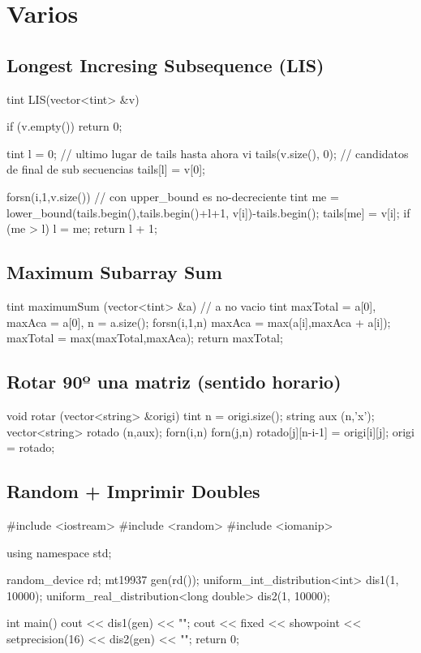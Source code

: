 \section{Varios}

\subsection{Longest Incresing Subsequence (LIS)}
\begin{code}
tint LIS(vector<tint> &v) {
  if (v.empty()) return 0;
  
  tint l = 0;             // ultimo lugar de tails hasta ahora
  vi tails(v.size(), 0);  // candidatos de final de sub secuencias
  tails[l] = v[0];
  
  forsn(i,1,v.size()) {
    // con upper_bound es no-decreciente
    tint me = lower_bound(tails.begin(),tails.begin()+l+1, v[i])-tails.begin();
    tails[me] = v[i];
    if (me > l) l = me;
  }
  return l + 1;
}
\end{code}

\subsection{Maximum Subarray Sum}
\begin{code}
tint maximumSum (vector<tint> &a) // a no vacio
{
	tint maxTotal = a[0], maxAca = a[0], n = a.size();
	forsn(i,1,n)
	{
		maxAca = max(a[i],maxAca + a[i]);
		maxTotal = max(maxTotal,maxAca);
	}
	return maxTotal;
}
\end{code}

\subsection{Rotar 90º una matriz (sentido horario)}
\begin{code}
void rotar (vector<string> &origi) 
{
	tint n = origi.size();
	string aux (n,'x');
	vector<string> rotado (n,aux);
	forn(i,n)
	forn(j,n)
		rotado[j][n-i-1] = origi[i][j];
	origi = rotado;
}
\end{code}

\subsection{Random + Imprimir Doubles}
\begin{code}
#include <iostream>
#include <random>
#include <iomanip>

using namespace std;

random_device rd;
mt19937 gen(rd());
uniform_int_distribution<int> dis1(1, 10000);
uniform_real_distribution<long double> dis2(1, 10000);

int main()
{
	cout <<  dis1(gen) << "\n";
	cout <<  fixed << showpoint << setprecision(16) << dis2(gen) << "\n";
	return 0;
}
\end{code}

